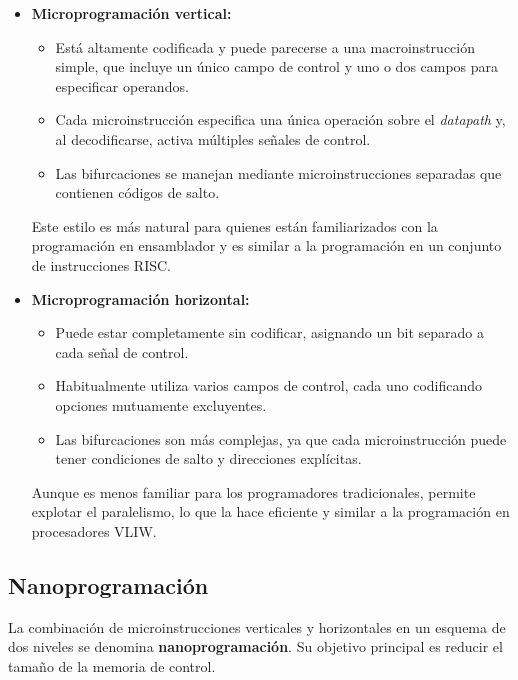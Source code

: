 \begin{itemize}
    \item \textbf{Microprogramación vertical:} 
        \begin{itemize}
            \item Está altamente codificada y puede parecerse a una macroinstrucción simple, que incluye un único campo de control y uno o dos campos para especificar operandos.
            \item Cada microinstrucción especifica una única operación sobre el \textit{datapath} y, al decodificarse, activa múltiples señales de control.
            \item Las bifurcaciones se manejan mediante microinstrucciones separadas que contienen códigos de salto.
        \end{itemize}
        Este estilo es más natural para quienes están familiarizados con la programación en ensamblador y es similar a la programación en un conjunto de instrucciones RISC.

    \item \textbf{Microprogramación horizontal:}
        \begin{itemize}
            \item Puede estar completamente sin codificar, asignando un bit separado a cada señal de control.
            \item Habitualmente utiliza varios campos de control, cada uno codificando opciones mutuamente excluyentes.
            \item Las bifurcaciones son más complejas, ya que cada microinstrucción puede tener condiciones de salto y direcciones explícitas.
        \end{itemize}
        Aunque es menos familiar para los programadores tradicionales, permite explotar el paralelismo, lo que la hace eficiente y similar a la programación en procesadores VLIW.
\end{itemize}

\subsection{Nanoprogramación}

La combinación de microinstrucciones verticales y horizontales en un esquema de dos niveles se denomina \textbf{nanoprogramación}. Su objetivo principal es reducir el tamaño de la memoria de control.

\begin{center}
    
\end{center}

